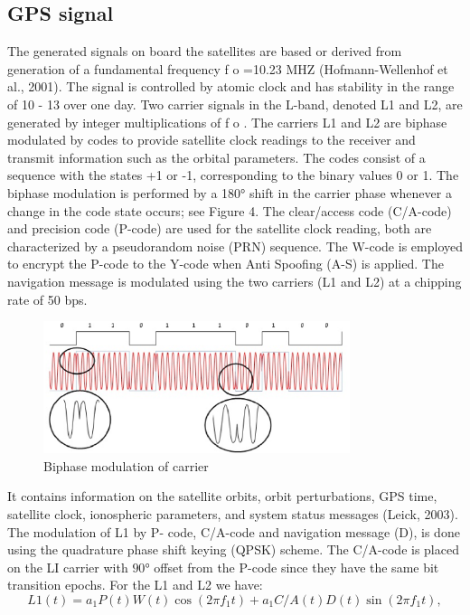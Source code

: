 \subsection{GPS signal}
The generated signals on board the satellites are based or derived from generation of a
fundamental frequency ƒ o =10.23 MHZ (Hofmann-Wellenhof et al., 2001). The signal is
controlled by atomic clock and has stability in the range of 10 - 13 over one day. Two carrier
signals in the L-band, denoted L1 and L2, are generated by integer multiplications of ƒ o . The
carriers L1 and L2 are biphase modulated by codes to provide satellite clock readings to the
receiver and transmit information such as the orbital parameters. The codes consist of a sequence
with the states +1 or -1, corresponding to the binary values 0 or 1. The biphase modulation is
performed by a 180° shift in the carrier phase whenever a change in the code state occurs; see
Figure 4. The clear/access code (C/A-code) and precision code (P-code) are used for the satellite
clock reading, both are characterized by a pseudorandom noise (PRN) sequence. The W-code is
employed to encrypt the P-code to the Y-code when Anti Spoofing (A-S) is applied. The
navigation message is modulated using the two carriers (L1 and L2) at a chipping rate of 50 bps.
\begin{figure}[htb] 
	\label{fig:biphase_modulation}
	\centering
	\includegraphics[width=0.8\textwidth]{figures/biphase_modulation}
	\caption{Biphase modulation of carrier}
\end{figure}
It contains information on the satellite orbits, orbit perturbations, GPS time, satellite clock,
ionospheric parameters, and system status messages (Leick, 2003). The modulation of L1 by P-
code, C/A-code and navigation message (D), is done using the quadrature phase shift keying
(QPSK) scheme. The C/A-code is placed on the LI carrier with $90°$ offset from the P-code since
they have the same bit transition epochs. For the L1 and L2 we have:
\begin{equation}
	\label{equ:l1_mod}
	L1(t) = a_{1}P(t)W(t)\cos(2\pi f_{1}t) + a_{1}C/A(t)D(t)\sin(2\pi f_{1}t),
\end{equation}


